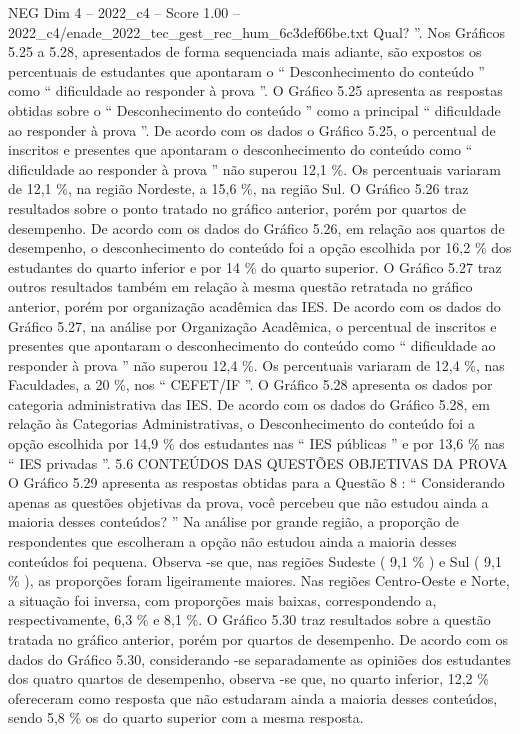 \begin{textsample}{NEG Dim 4 – 2022\_c4 – Score 1.00 – 2022\_c4/enade\_2022\_tec\_gest\_rec\_hum\_6c3def66be.txt}
Qual? ”.
Nos Gráficos 5.25 a 5.28, apresentados de forma sequenciada mais adiante, são expostos os percentuais de estudantes que apontaram o “ Desconhecimento do conteúdo ” como “ dificuldade ao responder à prova ”.
O Gráfico 5.25 apresenta as respostas obtidas sobre o “ Desconhecimento do conteúdo ” como a principal “ dificuldade ao responder à prova ”.
De acordo com os dados o Gráfico 5.25, o percentual de inscritos e presentes que apontaram o desconhecimento do conteúdo como “ dificuldade ao responder à prova ” não superou 12,1 \%.
Os percentuais variaram de 12,1 \%, na região Nordeste, a 15,6 \%, na região Sul.
O Gráfico 5.26 traz resultados sobre o ponto tratado no gráfico anterior, porém por quartos de desempenho.
De acordo com os dados do Gráfico 5.26, em relação aos quartos de desempenho, o desconhecimento do conteúdo foi a opção escolhida por 16,2 \% dos estudantes do quarto inferior e por 14 \% do quarto superior.
O Gráfico 5.27 traz outros resultados também em relação à mesma questão retratada no gráfico anterior, porém por organização acadêmica das IES.
De acordo com os dados do Gráfico 5.27, na análise por Organização Acadêmica, o percentual de inscritos e presentes que apontaram o desconhecimento do conteúdo como “ dificuldade ao responder à prova ” não superou 12,4 \%.
Os percentuais variaram de 12,4 \%, nas Faculdades, a 20 \%, nos “ CEFET/IF ”.
O Gráfico 5.28 apresenta os dados por categoria administrativa das IES.
De acordo com os dados do Gráfico 5.28, em relação às Categorias Administrativas, o Desconhecimento do conteúdo foi a opção escolhida por 14,9 \% dos estudantes nas “ IES públicas ” e por 13,6 \% nas “ IES privadas ”. 5.6 CONTEÚDOS DAS QUESTÕES OBJETIVAS DA PROVA O Gráfico 5.29 apresenta as respostas obtidas para a Questão 8 : “ Considerando apenas as questões objetivas da prova, você percebeu que não estudou ainda a maioria desses conteúdos? ” Na análise por grande região, a proporção de respondentes que escolheram a opção não estudou ainda a maioria desses conteúdos foi pequena.
Observa -se que, nas regiões Sudeste ( 9,1 \% ) e Sul ( 9,1 \% ), as proporções foram ligeiramente maiores.
Nas regiões Centro-Oeste e Norte, a situação foi inversa, com proporções mais baixas, correspondendo a, respectivamente, 6,3 \% e 8,1 \%.
O Gráfico 5.30 traz resultados sobre a questão tratada no gráfico anterior, porém por quartos de desempenho.
De acordo com os dados do Gráfico 5.30, considerando -se separadamente as opiniões dos estudantes dos quatro quartos de desempenho, observa -se que, no quarto inferior, 12,2 \% ofereceram como resposta que não estudaram ainda a maioria desses conteúdos, sendo 5,8 \% os do quarto superior com a mesma resposta.

\end{textsample}
